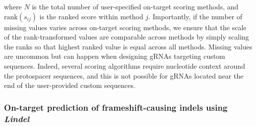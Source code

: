 \documentclass[pdftex,english,10pt]{article}
\begin{document}
where $N$ is the total number of user-specified on-target scoring methods, and $\text{rank}(s_{ij})$ is the ranked score within method $j$. Importantly, if the number of missing values varies across on-target scoring methods, we ensure that the scale of the rank-transformed values are comparable across methods by simply scaling the ranks so that highest ranked value is equal across all methods. Missing values are uncommon but can happen when designing gRNAs targeting custom sequences. Indeed, several scoring algorithms require nucleotide context around the protospacer sequences, and this is not possible for gRNAs located near the end of the user-provided custom sequences. 


\subsubsection*{On-target prediction of frameshift-causing indels using \textit{Lindel}}
\end{document}
